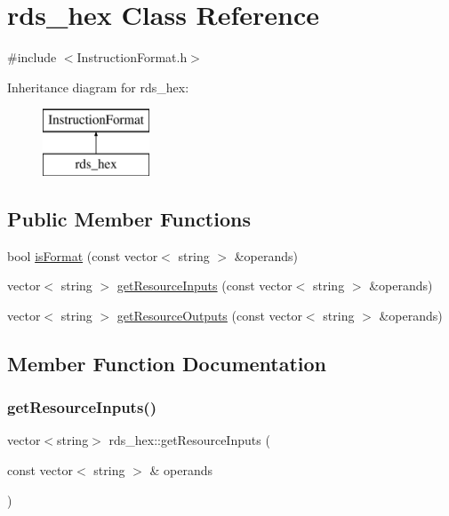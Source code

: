 \hypertarget{classrds__hex}{}\section{rds\+\_\+hex Class Reference}
\label{classrds__hex}


{\ttfamily \#include $<$Instruction\+Format.\+h$>$}

Inheritance diagram for rds\+\_\+hex\+:\begin{figure}[H]
\begin{center}
\leavevmode
\includegraphics[height=2.000000cm]{classrds__hex}
\end{center}
\end{figure}
\subsection*{Public Member Functions}
\begin{DoxyCompactItemize}
\item 
bool \hyperlink{classrds__hex_afcf9c40012c4a3d90cc5811cca063244}{is\+Format} (const vector$<$ string $>$ \&operands)
\item 
vector$<$ string $>$ \hyperlink{classrds__hex_a2f3730108e307942aeecc3b07d2b0f5c}{get\+Resource\+Inputs} (const vector$<$ string $>$ \&operands)
\item 
vector$<$ string $>$ \hyperlink{classrds__hex_a40821f2b6ed827019708864a90d7ee81}{get\+Resource\+Outputs} (const vector$<$ string $>$ \&operands)
\end{DoxyCompactItemize}


\subsection{Member Function Documentation}
\mbox{\label{classrds__hex_a2f3730108e307942aeecc3b07d2b0f5c}} 
\subsubsection{\texorpdfstring{get\+Resource\+Inputs()}{getResourceInputs()}}
{\footnotesize\ttfamily vector$<$string$>$ rds\+\_\+hex\+::get\+Resource\+Inputs (\begin{DoxyParamCaption}\item[{const vector$<$ string $>$ \&}]{operands }\end{DoxyParamCaption})\hspace{0.3cm}{\ttfamily [virtual]}}

